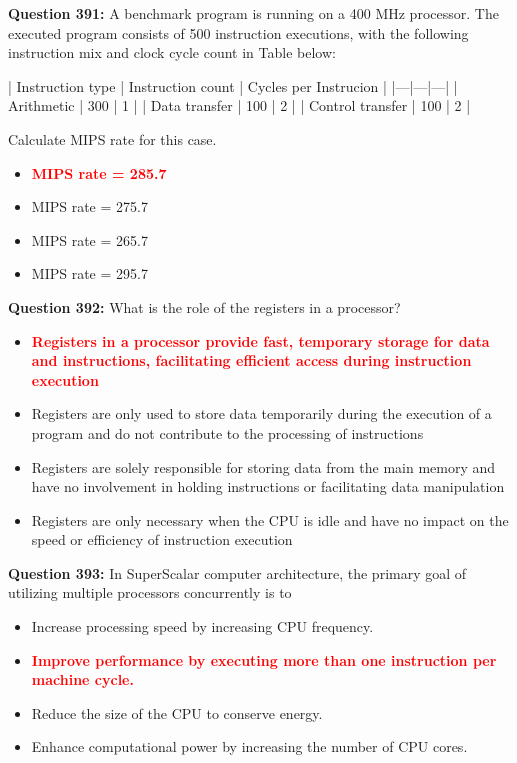 \documentclass[12pt,a4paper]{article}
\begin{document}
\textbf{Question 391:} A benchmark program is running on a 400 MHz processor. The executed program consists of 500 instruction executions, with the following instruction mix and clock cycle count in Table below:

| Instruction type | Instruction count | Cycles per Instrucion |
|---|---|---|
| Arithmetic | 300 | 1 |
| Data transfer | 100 | 2 |
| Control transfer | 100 | 2 |

Calculate MIPS rate for this case.

\begin{itemize}
    \item[\textbf{A.}] \textcolor{red}{\textbf{MIPS rate = 285.7}}
    \item[\textbf{B.}] MIPS rate = 275.7
    \item[\textbf{C.}] MIPS rate = 265.7
    \item[\textbf{D.}] MIPS rate = 295.7
\end{itemize}

\vspace{0.5cm}

\textbf{Question 392:} What is the role of the registers in a processor?

\begin{itemize}
    \item[\textbf{A.}] \textcolor{red}{\textbf{Registers in a processor provide fast, temporary storage for data and instructions, facilitating efficient access during instruction execution}}
    \item[\textbf{B.}] Registers are only used to store data temporarily during the execution of a program and do not contribute to the processing of instructions
    \item[\textbf{C.}] Registers are solely responsible for storing data from the main memory and have no involvement in holding instructions or facilitating data manipulation
    \item[\textbf{D.}] Registers are only necessary when the CPU is idle and have no impact on the speed or efficiency of instruction execution
\end{itemize}

\vspace{0.5cm}

\textbf{Question 393:} In SuperScalar computer architecture, the primary goal of utilizing multiple processors concurrently is to

\begin{itemize}
    \item[\textbf{A.}] Increase processing speed by increasing CPU frequency.
    \item[\textbf{B.}] \textcolor{red}{\textbf{Improve performance by executing more than one instruction per machine cycle.}}
    \item[\textbf{C.}] Reduce the size of the CPU to conserve energy.
    \item[\textbf{D.}] Enhance computational power by increasing the number of CPU cores.
\end{itemize}
\end{document}
